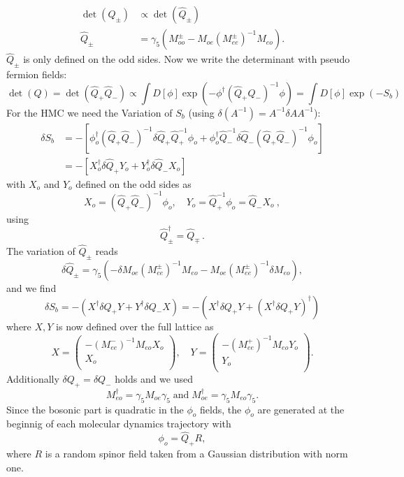 \begin{equation}
  \label{eq:eo4}
  \begin{split}
    \det(Q_\pm) &\propto \det(\hat Q_\pm) \\
    \hat Q_\pm &= \gamma_5(M_{oo}^\pm - M_{oe}(M_{ee}^\pm )^{-1}M_{eo}). 
  \end{split}
\end{equation}
$\hat Q_\pm$ is only defined on the odd sides. Now we write the
determinant with pseudo fermion fields:
\[
\det(Q) = \det(\hat Q_+ \hat Q_-) \propto \int D[\phi]\exp(-\phi^\dagger (\hat Q_+ \hat Q_-)^{-1} \phi) = \int D[\phi]\exp(-S_b)
\]
For the HMC we need the Variation of $S_b$ (using $\delta (A^{-1})=A^{-1}\delta A A^{-1}$):
\begin{equation}
  \label{eq:eo5}
  \begin{split}
    \delta S_b &= -[\phi_o^\dagger (\hat Q_+ \hat Q_-)^{-1}\delta \hat Q_+ \hat Q_+^{-1}\phi_o +
    \phi_o^\dagger\hat Q_-^{-1}\delta \hat Q_- (\hat Q_+ \hat Q_-)^{-1} \phi_o ] \\
     &= -[X_o^\dagger \delta \hat Q_+ Y_o + Y_o^\dagger \delta\hat Q_- X_o]
  \end{split}
\end{equation}
with $X_o$ and $Y_o$ defined on the odd sides as 
\begin{equation}
  \label{eq:eo6}
  X_o = (\hat Q_+ \hat Q_-)^{-1} \phi_o,\quad Y_o = \hat Q_+^{-1}\phi_o=\hat
  Q_-X_o\ ,
\end{equation}
using
\[
\hat Q_\pm^\dagger = \hat Q_\mp\, .
\]
The variation of $\hat Q_\pm$ reads
\begin{equation}
  \label{eq:eo7}
  \delta \hat Q_\pm = \gamma_5\left(-\delta M_{oe}(M_{ee}^\pm )^{-1}M_{eo} -
    M_{oe}(M_{ee}^\pm )^{-1}\delta M_{eo}\right),
\end{equation}
and we find
\begin{equation}
  \label{eq:eo8}
  \delta S_b = -(X^\dagger\delta Q_+ Y + Y^\dagger\delta Q_- X) = -(X^\dagger\delta Q_+ Y +(X^\dagger\delta Q_+ Y)^\dagger)
\end{equation}
where $X,Y$ is now defined over the full lattice as
\begin{equation}
  \label{eq:eo9}
  X = 
  \begin{pmatrix}
    -(M_{ee}^-)^{-1}M_{eo}X_o \\ X_o\\
  \end{pmatrix},\quad
  Y = 
  \begin{pmatrix}
    -(M_{ee}^+)^{-1}M_{eo}Y_o \\ Y_o\\
  \end{pmatrix}.
\end{equation}
Additionally $\delta Q_+ = \delta Q_-$ holds and we used
\[
M_{eo}^\dagger = \gamma_5 M_{oe}\gamma_5\;\textrm{and}\; M_{oe}^\dagger = \gamma_5 M_{eo}\gamma_5.
\]
Since the bosonic part is quadratic in the $\phi_o$ fields, the $\phi_o$ are
generated at the beginnig of each molecular dynamics trajectory with
\begin{equation}
  \label{eq:eo10}
  \phi_o = \hat Q_+ R,
\end{equation}
where $R$ is a random spinor field taken from a Gaussian distribution
with norm one.

